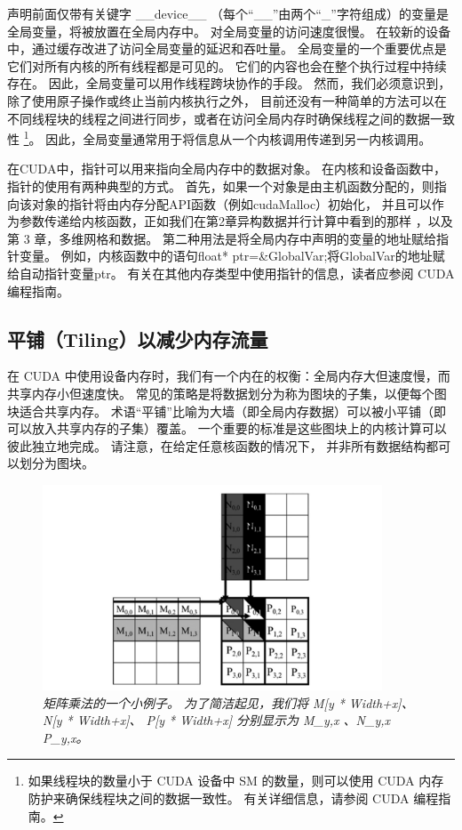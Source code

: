 声明前面仅带有关键字 \_\_device\_\_ （每个“\_\_”由两个“\_”字符组成）的变量是全局变量，将被放置在全局内存中。 
对全局变量的访问速度很慢。 在较新的设备中，通过缓存改进了访问全局变量的延迟和吞吐量。 
全局变量的一个重要优点是它们对所有内核的所有线程都是可见的。 它们的内容也会在整个执行过程中持续存在。 
因此，全局变量可以用作线程跨块协作的手段。 然而，我们必须意识到，除了使用原子操作或终止当前内核执行之外，
目前还没有一种简单的方法可以在不同线程块的线程之间进行同步，或者在访问全局内存时确保线程之间的数据一致性
\footnote{如果线程块的数量小于 CUDA 设备中 SM 的数量，则可以使用 CUDA 内存防护来确保线程块之间的数据一致性。 
有关详细信息，请参阅 CUDA 编程指南。}。 
因此，全局变量通常用于将信息从一个内核调用传递到另一内核调用。

在CUDA中，指针可以用来指向全局内存中的数据对象。 在内核和设备函数中，指针的使用有两种典型的方式。 
首先，如果一个对象是由主机函数分配的，则指向该对象的指针将由内存分配API函数（例如cudaMalloc）初始化，
并且可以作为参数传递给内核函数，正如我们在第2章异构数据并行计算中看到的那样 ，以及第 3 章，多维网格和数据。 
第二种用法是将全局内存中声明的变量的地址赋给指针变量。 
例如，内核函数中的语句{float* ptr=\&GlobalVar;}将GlobalVar的地址赋给自动指针变量ptr。 
有关在其他内存类型中使用指针的信息，读者应参阅 CUDA 编程指南。

\subsection{平铺（Tiling）以减少内存流量}
在 CUDA 中使用设备内存时，我们有一个内在的权衡：全局内存大但速度慢，而共享内存小但速度快。 
常见的策略是将数据划分为称为图块的子集，以便每个图块适合共享内存。 
术语“平铺”比喻为大墙（即全局内存数据）可以被小平铺（即可以放入共享内存的子集）覆盖。 
一个重要的标准是这些图块上的内核计算可以彼此独立地完成。 请注意，在给定任意核函数的情况下，
并非所有数据结构都可以划分为图块。

\begin{figure}[H]
	\centering
	\includegraphics[width=0.9\textwidth]{figs/F5.5.png}
	\caption{\textit{矩阵乘法的一个小例子。 为了简洁起见，我们将 M[y * Width+x]、N[y * Width+x]、
	P[y * Width+x] 分别显示为 M\_{y,x} 、N\_{y,x} P\_{y,x}。}}
\end{figure}

